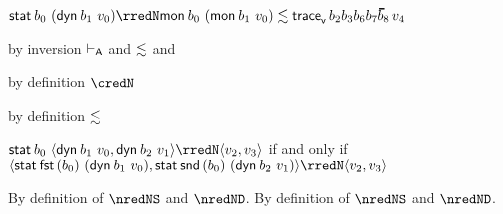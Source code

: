 {\begin{lamportproof*}
    \begin{pfproof}
      \qedstep
        \begin{pfproof}
          $\estab{\sbnd_0}{(\edynb{\sbnd_1}{\svalue_0})} \rredN \rexpr{\emon{\sbnd_0}{(\emon{\sbnd_1}{\svalue_0})}}{\ehist{\fconcat{\sbnd_2}{\fconcat{\sbnd_3}{\fconcat{\sbnd_6}{\fconcat{\sbnd_7}{\sblist_8}}}}}{\svalue_4}}$
        \end{pfproof}
    \end{pfproof}

    \begin{pfproof}
        \begin{pfproof}
          by inversion $\vdash_{\mathsf{A}}$ and $\lesssim$ and 
        \end{pfproof}
        \begin{pfproof}
          by definition $\credN$
        \end{pfproof}
      \qedstep
        \begin{pfproof}
          by definition $\lesssim$
        \end{pfproof}
    \end{pfproof}

\end{lamportproof*}}

\begin{lemma}\label{H-stadyn-pair}
  $\estab{\sbnd_0}{\epair{\edynb{\sbnd_1}{\svalue_0}}{\edynb{\sbnd_2}{\svalue_1}}} \rredN \epair{\svalue_2}{\svalue_3}$
  if and only if
  \\
  $\epair{\estab{\fbndfst{\sbnd_0}}{(\edynb{\sbnd_1}{\svalue_0})}}{\estab{\fbndsnd{\sbnd_0}}{(\edynb{\sbnd_2}{\svalue_1})}} \rredN \epair{\svalue_2}{\svalue_3}$
\end{lemma}{
  \newcommand{\shortpf}{By definition of $\nredNS$ and $\nredND$.}
\begin{lamportproof*}
  \shortpf
\mainproof
  \shortpf
\end{lamportproof*}}

